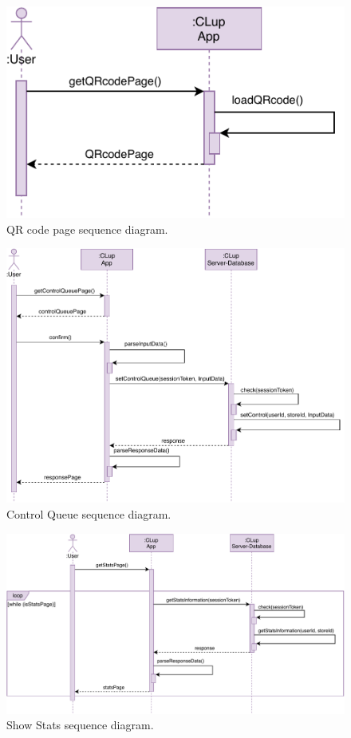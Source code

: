 \begin{figure}[H]
	\centering
	\includegraphics[width=1.0\textwidth]{images/getQRcodePage_sequence_diagram.pdf}
	\caption{QR code page sequence diagram.}
\end{figure}

\begin{figure}[H]
	\centering
	\includegraphics[width=1.0\textwidth]{images/getControlQueuePage_sequence_diagram.pdf}
	\caption{Control Queue sequence diagram.}
\end{figure}

\begin{figure}[H]
	\centering
	\includegraphics[width=1.0\textwidth]{images/getShowStatsPage_sequence_diagram.pdf}
	\caption{Show Stats sequence diagram.}
\end{figure}

